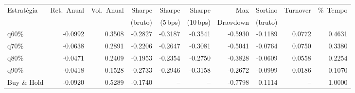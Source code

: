 \begin{tabular}{lrrrrrrrrr}
\toprule
Estrat\'egia & Ret.\ Anual & Vol.\ Anual & Sharpe & Sharpe & Sharpe & Max & Sortino & Turnover & \%\ Tempo \\
 &  &  & (bruto) & (5\,bps) & (10\,bps) & Drawdown & (bruto) &  &  \\
\midrule
q60\% & -0.0992 & 0.3508 & -0.2827 & -0.3187 & -0.3541 & -0.5930 & -0.1189 & 0.0772 & 0.4631 \\
q70\% & -0.0638 & 0.2891 & -0.2206 & -0.2647 & -0.3081 & -0.5041 & -0.0764 & 0.0750 & 0.3380 \\
q80\% & -0.0471 & 0.2409 & -0.1953 & -0.2354 & -0.2750 & -0.3828 & -0.0609 & 0.0558 & 0.2254 \\
q90\% & -0.0418 & 0.1528 & -0.2733 & -0.2946 & -0.3158 & -0.2672 & -0.0999 & 0.0186 & 0.1070 \\
\midrule
Buy \& Hold & -0.0920 & 0.5289 & -0.1740 & -- & -- & -0.7798 & 0.1114 & -- & 1.0000 \\
\bottomrule
\end{tabular}